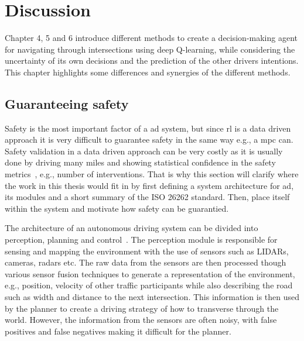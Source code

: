 \chapter{Discussion}
\label{ch:discussion}
Chapter 4, 5 and 6 introduce different methods to create a decision-making agent for navigating through intersections using deep Q-learning, while considering the uncertainty of its own decisions and the prediction of the other drivers intentions. This chapter highlights some differences and synergies of the different methods. 

\section{Guaranteeing safety}
\label{ch:system_architecture}
Safety is the most important factor of a \gls{ad} system, but since \gls{rl} is a data driven approach it is very difficult to guarantee safety in the same way e.g., a \gls{mpc} can. Safety validation in a data driven approach can be very costly as it is usually done by driving many miles and showing statistical confidence in the safety metrics~\cite{koopman2016,asljung2017}, e.g., number of interventions. That is why this section will clarify where the work in this thesis would fit in by first defining a system architecture for \gls{ad}, its modules and a short summary of the ISO 26262 standard. Then, place itself within the system and motivate how safety can be guarantied. 

The architecture of an autonomous driving system can be divided into perception, planning and control~\cite{Schwarting2018,Kortenkamp2008}.
The perception module is responsible for sensing and mapping the environment with the use of sensors such as LIDARs, cameras, radars etc. The raw data from the sensors are then processed though various sensor fusion techniques to generate a representation of the environment, e.g., position, velocity of other traffic participants while also describing the road such as width and distance to the next intersection. This information is then used by the planner to create a driving strategy of how to transverse through the world. However, the information from the sensors are often noisy, with false positives and false negatives making it difficult for the planner.

